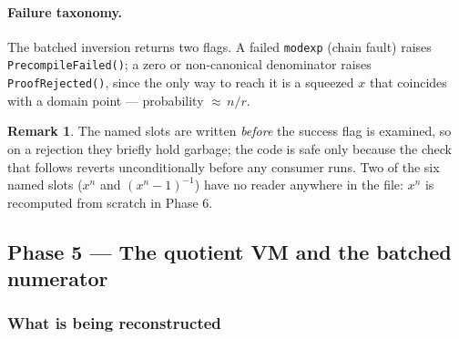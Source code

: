 \documentclass[11pt,a4paper]{article}
\newcommand{\code}[1]{\texttt{#1}}
\newcommand{\err}[1]{\textcolor{red!60!black}{\texttt{#1}}}
\theoremstyle{definition}
\newtheorem{remark}{Remark}[section]
\begin{document}
\paragraph{Failure taxonomy.}
The batched inversion returns two flags. A failed \code{modexp} (chain fault)
raises \err{PrecompileFailed()}; a zero or non-canonical denominator raises
\err{ProofRejected()}, since the only way to reach it is a squeezed $x$ that
coincides with a domain point --- probability ${\approx}\,n/r$.

\begin{remark}
The named slots are written \emph{before} the success flag is examined, so on a
rejection they briefly hold garbage; the code is safe only because the check
that follows reverts unconditionally before any consumer runs. Two of the six
named slots ($x^{n}$ and $(x^{n}-1)^{-1}$) have no reader anywhere in the file:
$x^{n}$ is recomputed from scratch in Phase 6.
\end{remark}

\subsection{Phase 5 --- The quotient VM and the batched numerator}
\label{sec:qvm}

\subsubsection{What is being reconstructed}
\end{document}
